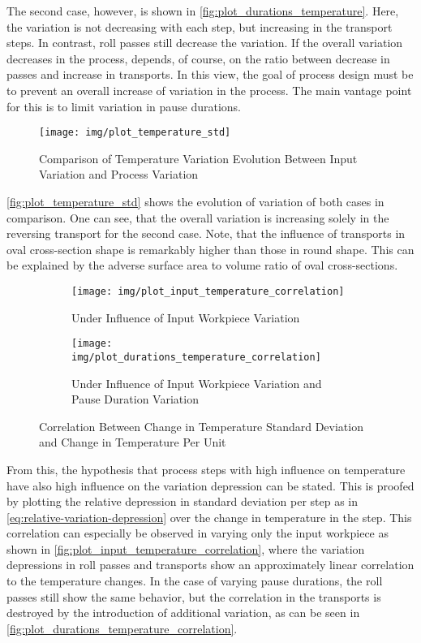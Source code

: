 The second case, however, is shown in \autoref{fig:plot_durations_temperature}.
Here, the variation is not decreasing with each step, but increasing in the transport steps.
In contrast, roll passes still decrease the variation.
If the overall variation decreases in the process, depends, of course, on the ratio between decrease in passes and increase in transports.
In this view, the goal of process design must be to prevent an overall increase of variation in the process.
The main vantage point for this is to limit variation in pause durations.

\begin{figure}
    \centering
    \texttt{[image: img/plot\_temperature\_std]}
    \caption{Comparison of Temperature Variation Evolution Between Input Variation and Process Variation}
    \label{fig:plot_temperature_std}
\end{figure}

\autoref{fig:plot_temperature_std} shows the evolution of variation of both cases in comparison.
One can see, that the overall variation is increasing solely in the reversing transport for the second case.
Note, that the influence of transports in oval cross-section shape is remarkably higher than those in round shape.
This can be explained by the adverse surface area to volume ratio of oval cross-sections.

\begin{figure}
    \begin{subfigure}{\linewidth}
        \centering
        \texttt{[image: img/plot\_input\_temperature\_correlation]}
        \caption{Under Influence of Input Workpiece Variation}
        \label{fig:plot_input_temperature_correlation}
    \end{subfigure}
    \begin{subfigure}{\linewidth}
        \centering
        \texttt{[image: img/plot\_durations\_temperature\_correlation]}
        \caption{Under Influence of Input Workpiece Variation and Pause Duration Variation}
        \label{fig:plot_durations_temperature_correlation}
    \end{subfigure}
    \caption{Correlation Between Change in Temperature Standard Deviation and Change in Temperature Per Unit}
\end{figure}

From this, the hypothesis that process steps with high influence on temperature have also high influence on the variation depression can be stated.
This is proofed by plotting the relative depression in standard deviation per step as in \autoref{eq:relative-variation-depression} over the change in temperature in the step.
This correlation can especially be observed in varying only the input workpiece as shown in \autoref{fig:plot_input_temperature_correlation}, where the variation depressions in roll passes and transports show an approximately linear correlation to the temperature changes.
In the case of varying pause durations, the roll passes still show the same behavior, but the correlation in the transports is destroyed by the introduction of additional variation, as can be seen in \autoref{fig:plot_durations_temperature_correlation}.

